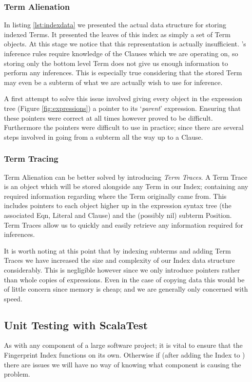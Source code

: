 \subsubsection{Term Alienation}
In listing \ref{lst:indexdata} we presented the actual data structure for storing
indexed Terms. It presented the leaves of this index as simply a set of Term objects.
At this stage we notice that this representation is actually insufficient. \Beagle's
inference rules require knowledge of the Clauses which we are operating on, so
storing only the bottom level Term does not give us enough information to perform any
inferences. This is especially true considering that the stored Term may even
be a subterm of what we are actually wish to use for inference.

A first attempt to solve this issue involved giving every object in the expression
tree (Figure \ref{fig:expressions}) a pointer to its `\emph{parent}' expression.
Ensuring that these pointers were correct at all times however proved to be
difficult. Furthermore the pointers were difficult to use in practice; since there
are several steps involved in going from a subterm all the way up to a Clause.

\subsubsection{Term Tracing}

Term Alienation can be better solved by introducing \emph{Term Traces}. A Term Trace
is an object which will be stored alongside any Term in our Index; containing any
required information regarding where the Term originally came from. This includes
pointers to each object higher up in the expression syntax tree (the associated Eqn, Literal
and Clause) and the (possibly nil) subterm Position. Term Traces allow us to quickly
and easily retrieve any information required for inferences.
 
It is worth noting at this point that by indexing subterms and adding Term Traces we have
increased the size and complexity of our Index data structure considerably.
This is negligible however since we only introduce pointers rather than whole
copies of expressions. Even in the case of copying data this would be of little
concern since memory is cheap; and we are generally only concerned with speed.

\subsection{Unit Testing with ScalaTest}
\label{sec:unittest}

As with any component of a large software project; it is vital to ensure that the
Fingerprint Index functions on its own. Otherwise if (after adding the Index to
\beagle) there are issues we will have no way of knowing what component is
causing the problem.


